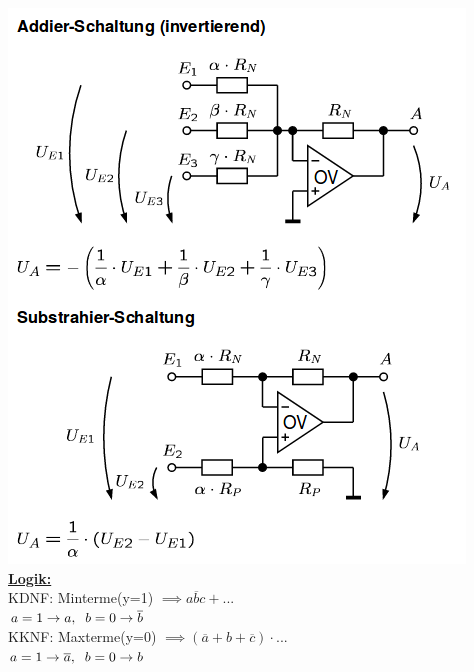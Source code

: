 \documentclass[8pt]{extarticle}
\begin{document}
\begin{minipage}{0.33\textwidth}

\includegraphics[scale=0.3]{opv1.png}\\
\underline{\textbf{Logik:}}\\
KDNF: Minterme(y=1) $\implies a\overline{b}c + ...$\\
\phantom{sssi} $a=1 \to a, \hspace{2mm} b=0 \to \overline{b}$ \\
KKNF: Maxterme(y=0) $\implies (\overline{a}+b+\overline{c}) \cdot ...$\\
\phantom{sssi} $a=1 \to \overline{a}, \hspace{2mm} b=0 \to b$ \\


\end{minipage}
\end{document}
